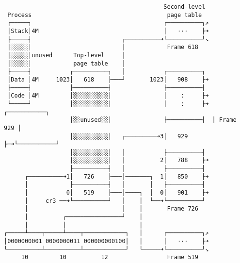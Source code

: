 \documentclass[varwidth=50em]{standalone}
\begin{document}
\begin{verbatim}
                                              Second-level
 Process                                       page table
 ┌─────┐                                      ┌──────────┐↗
 │Stack│4M                                    │   ···    ├➜
 ├─────┤                          ┌──────────➜└──────────┘↘
 │░░░░░│                          │            Frame 618
 │░░░░░│unused      Top-level     │
 │░░░░░│            page table    │
 ├─────┤           ┌──────────┐   │           ┌──────────┐
 │Data │4M     1023│   618    ├───┘       1023│   908    ├➜
 ├─────┤           ├──────────┤               ├──────────┤
 │Code │4M         │░░░░░░░░░░│               │    :     ├➜
 └─────┘           │░░░░░░░░░░│               │    :     ├➜ ┌───────────┐
                   │░░unused░░│               ├──────────┤  │ Frame 929 │
                   │░░░░░░░░░░│   ┌─────────➜3│   929    ├─➜└───────────┘
                   │░░░░░░░░░░│   │           ├──────────┤
                   │░░░░░░░░░░│   │          2│   788    ├➜
                   ├──────────┤   │           ├──────────┤
      ┌──────────➜1│   726    ├───│───────┐  1│   850    ├➜
      │            ├──────────┤   │       │   ├──────────┤
      │           0│   519    ├───│────┐  │  0│   901    ├➜
      │     cr3 ──➜└──────────┘   │    │  └──➜└──────────┘
      │                           │    │       Frame 726
      │          ┌────────────────┘    │
      │          │                     │
┌─────┴────┬─────┴────┬────────────┐   │      ┌──────────┐↗
│0000000001 0000000011 000000000100│   │      │   ···    ├➜
└──────────┴──────────┴────────────┘   └─────➜└──────────┘↘
     10         10          12                 Frame 519
\end{verbatim}
\end{document}
